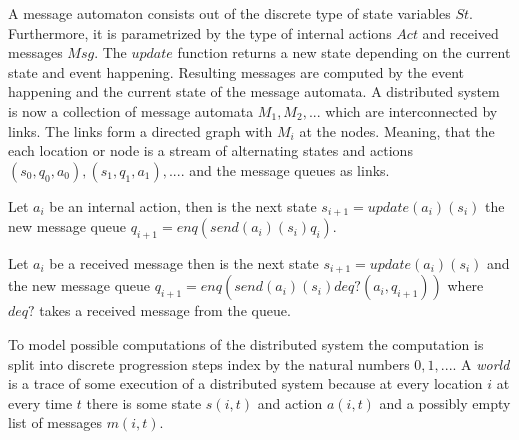 A message automaton consists out of the discrete type of state variables
$St$. Furthermore, it is parametrized by the type of internal actions $Act$ 
and received messages $Msg$. The $update$ function returns a new state
depending on the current state and event happening. Resulting messages are
computed by the event happening and the current state of the message automata.
A distributed system is now a collection of message automata $M_1,M_2,...$ which
are interconnected by links. The links form a directed graph with $M_i$ at the
nodes. Meaning, that the each location or node is a stream of alternating states
and actions $(s_0,q_0,a_0),(s_1,q_1,a_1),....$ and the message queues as links.~\cite{bickford2003logic}

\begin{defi}
  Let $a_i$ be an internal action, then is the next state
  $s_{i+1}=update(a_i)(s_i)$ the new message queue $q_{i+1}=enq(send(a_i)(s_i)q_i)$.
\end{defi}

\begin{defi}
  Let $a_i$ be a received message then is the next state
  $s_{i+1}=update(a_i)(s_i)$ and the new message queue
  $q_{i+1}=enq(send(a_i)(s_i)deq?(a_i,q_{i+1}))$ where $deq?$ takes
  a received message from the queue. 
\end{defi}

To model possible computations of the distributed system the computation
is split into discrete progression steps index by the natural numbers $0,1,...$.
A \textit{world} is a trace of some execution of a distributed system because
at every location $i$ at every time $t$ there is some state $s(i,t)$ and action
$a(i,t)$ and a possibly empty list of messages $m(i,t)$.


